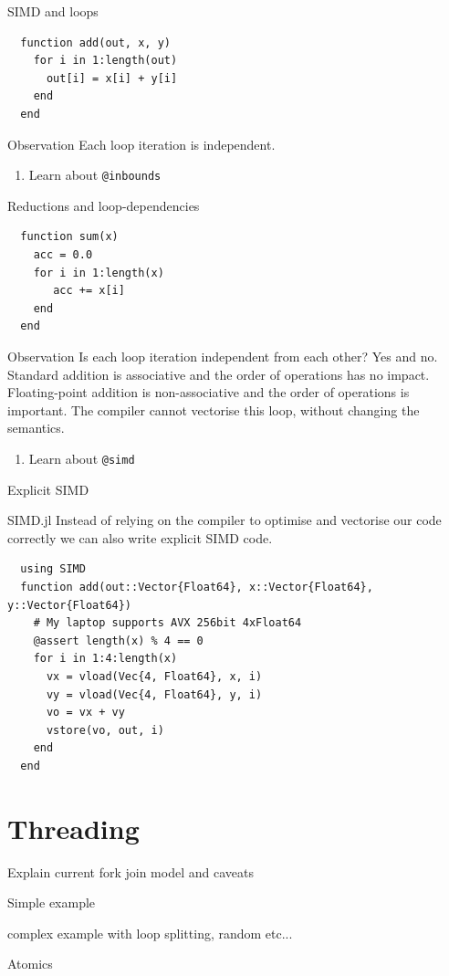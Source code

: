\documentclass{beamer}
\begin{document}
\begin{frame}[fragile]{SIMD and loops}
  \begin{lstlisting}
  function add(out, x, y)
    for i in 1:length(out)
      out[i] = x[i] + y[i]
    end
  end
  \end{lstlisting}

  \begin{block}{Observation}
    Each loop iteration is independent.
  \end{block}
  \begin{enumerate}
    \item Learn about \lstinline{@inbounds}
  \end{enumerate}
\end{frame}
\begin{frame}[fragile]{Reductions and loop-dependencies}
  \begin{lstlisting}
  function sum(x)
    acc = 0.0
    for i in 1:length(x)
       acc += x[i]
    end
  end
  \end{lstlisting}
  \begin{block}{Observation}
    Is each loop iteration independent from each other? Yes and no.
    Standard addition is associative and the order of operations has no impact.
    Floating-point addition is non-associative and the order of operations is important.
    The compiler cannot vectorise this loop, without changing the semantics.
  \end{block}
  \begin{enumerate}
    \item Learn about \lstinline{@simd}
  \end{enumerate}
\end{frame}
\begin{frame}[fragile]{Explicit SIMD}
  \begin{block}{SIMD.jl}
    Instead of relying on the compiler to optimise and vectorise our code correctly we can also write explicit SIMD code.
  \end{block}
  \begin{lstlisting}
  using SIMD
  function add(out::Vector{Float64}, x::Vector{Float64}, y::Vector{Float64})
    # My laptop supports AVX 256bit 4xFloat64
    @assert length(x) % 4 == 0
    for i in 1:4:length(x)
      vx = vload(Vec{4, Float64}, x, i)
      vy = vload(Vec{4, Float64}, y, i)
      vo = vx + vy
      vstore(vo, out, i)
    end
  end
  \end{lstlisting}
\end{frame}
\section{Threading}
\begin{frame}
  Explain current fork join model and caveats
\end{frame}
\begin{frame}
  Simple example
\end{frame}
\begin{frame}
  complex example with loop splitting, random etc...
\end{frame}
\begin{frame}
  Atomics
\end{frame}
\end{document}
